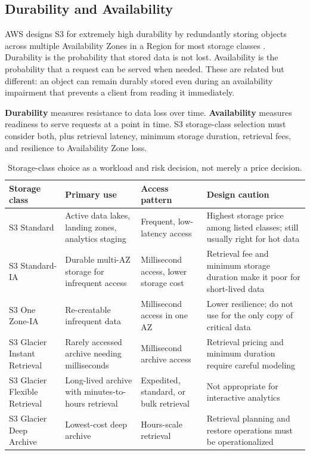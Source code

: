 \subsection{Durability and Availability}
AWS designs S3 for extremely high durability by redundantly storing objects across multiple Availability Zones in a Region for most storage classes \cite{awsS3UserGuide}. Durability is the probability that stored data is not lost. Availability is the probability that a request can be served when needed. These are related but different: an object can remain durably stored even during an availability impairment that prevents a client from reading it immediately.

\begin{definitionbox}
\textbf{Durability} measures resistance to data loss over time. \textbf{Availability} measures readiness to serve requests at a point in time. S3 storage-class selection must consider both, plus retrieval latency, minimum storage duration, retrieval fees, and resilience to Availability Zone loss.
\end{definitionbox}

\begin{table}[H]
\centering
\small
\begin{tabular}{@{}p{3.2cm}p{3.4cm}p{3.2cm}p{4.0cm}@{}}
\toprule
\textbf{Storage class} & \textbf{Primary use} & \textbf{Access pattern} & \textbf{Design caution} \\
\midrule
S3 Standard & Active data lakes, landing zones, analytics staging & Frequent, low-latency access & Highest storage price among listed classes; still usually right for hot data \\
S3 Standard-IA & Durable multi-AZ storage for infrequent access & Millisecond access, lower storage cost & Retrieval fee and minimum storage duration make it poor for short-lived data \\
S3 One Zone-IA & Re-creatable infrequent data & Millisecond access in one AZ & Lower resilience; do not use for the only copy of critical data \\
S3 Glacier Instant Retrieval & Rarely accessed archive needing milliseconds & Millisecond archive access & Retrieval pricing and minimum duration require careful modeling \\
S3 Glacier Flexible Retrieval & Long-lived archive with minutes-to-hours retrieval & Expedited, standard, or bulk retrieval & Not appropriate for interactive analytics \\
S3 Glacier Deep Archive & Lowest-cost deep archive & Hours-scale retrieval & Retrieval planning and restore operations must be operationalized \\
\bottomrule
\end{tabular}
\caption{Storage-class choice as a workload and risk decision, not merely a price decision.}
\label{tab:s3-storage-classes}
\end{table}

